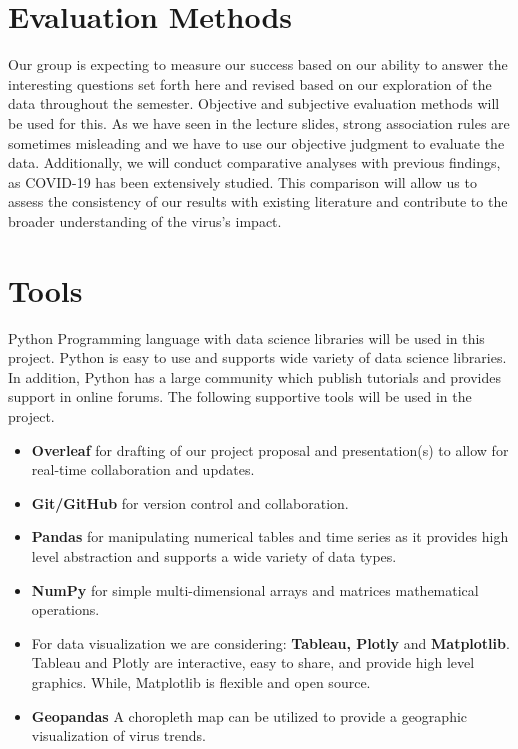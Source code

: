 \documentclass[sigconf,screen,nonacm]{acmart}
\begin{document}
\section{Evaluation Methods}
Our group is expecting to measure our success based on our ability to answer the interesting questions set forth here and revised based on our exploration of the data throughout the semester. Objective and subjective evaluation methods will be used for this. As we have seen in the lecture slides, strong association rules are sometimes misleading and we have to use our objective judgment to evaluate the data. Additionally, we will conduct comparative analyses with previous findings, as COVID-19 has been extensively studied. This comparison will allow us to assess the consistency of our results with existing literature and contribute to the broader understanding of the virus's impact.


\section{Tools}
Python Programming language with data science libraries will be used in this project. Python is easy to use and supports wide variety of data science libraries. In addition, Python has a large community which publish tutorials and provides support in online forums.
The following supportive tools will be used in the project. 
\begin{itemize}
\item \textbf{Overleaf} for drafting of our project proposal and presentation(s) to allow for real-time collaboration and updates.
\item \textbf{Git/GitHub} for version control and collaboration.
\item \textbf{Pandas} for manipulating numerical tables and time series as it provides high level abstraction and supports a wide variety of data types.
\item \textbf{NumPy} for simple multi-dimensional arrays and matrices mathematical operations.
\item For data visualization we are considering: \textbf{Tableau, Plotly} and \textbf{Matplotlib}. Tableau and Plotly are interactive, easy to share, and provide high level graphics. While, Matplotlib is flexible and open source. 
\item \textbf{Geopandas} A choropleth map can be utilized to provide a geographic visualization of virus trends.

\end{itemize}
\end{document}
